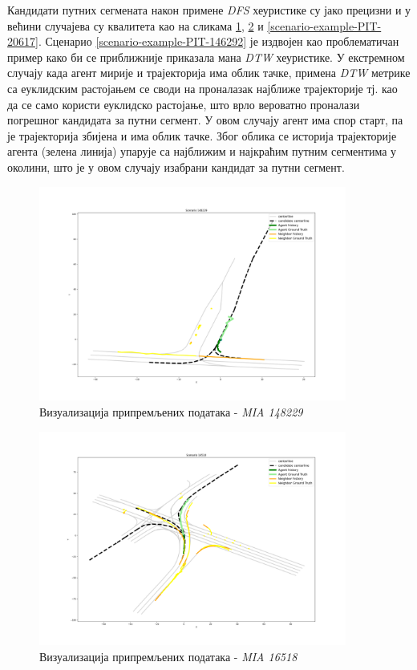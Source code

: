 \documentclass[11pt,oneside]{memoir}
\begin{document}
Кандидати путних сегмената након примене \textit{DFS} хеуристике су јако прецизни и у већини случајева су квалитета као на
сликама \ref{scenario-example-MIA-148229}, \ref{scenario-example-MIA-16518} и \ref{scenario-example-PIT-20617}. Сценарио 
\ref{scenario-example-PIT-146292} је издвојен као проблематичан пример како би се приближније приказала мана \textit{DTW} хеуристике.
У екстремном случају када агент мирије и трајекторија има облик тачке, примена \textit{DTW} метрике са еуклидским растојањем се своди на
проналазак најближе трајекторије тј. као да се само користи еуклидско растојање, што врло вероватно проналази погрешног кандидата за путни сегмент.
У овом случају агент има спор старт, па је трајекторија збијена и има облик тачке. Због облика се историја трајекторије агента (зелена линија)
упарује са најближим и најкраћим путним сегментима у околини, што је у овом случају изабрани кандидат за путни сегмент.

\begin{figure}[H]
  \includegraphics[width=0.9\textwidth]{images/scenario_MIA_148229.png}
  \caption{Визуализација припремљених података - \textit{MIA 148229}}
  \label{scenario-example-MIA-148229}
\end{figure}

\begin{figure}[H]
  \includegraphics[width=0.9\textwidth]{images/scenario_MIA_16518.png}
  \caption{Визуализација припремљених података - \textit{MIA 16518}}
  \label{scenario-example-MIA-16518}
\end{figure}
\end{document}
